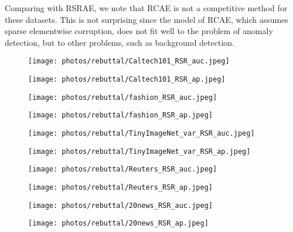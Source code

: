 \documentclass{article} \usepackage{iclr2020_conference,times}
\begin{document}
Comparing with RSRAE, we note that RCAE is not a competitive method for these datasets. This is not surprising since the model of RCAE, which assumes sparse elementwise corruption, does not fit well to the problem of anomaly detection, but to other problems, such as background detection. 


\begin{figure}[htbp]
\centering
\begin{minipage}[t]{0.48\textwidth}
\centering
\texttt{[image: photos/rebuttal/Caltech101\_RSR\_auc.jpeg]}
\end{minipage}
\begin{minipage}[t]{0.48\textwidth}
\centering
\texttt{[image: photos/rebuttal/Caltech101\_RSR\_ap.jpeg]}
\end{minipage}


\centering
\begin{minipage}[t]{0.48\textwidth}
\centering
\texttt{[image: photos/rebuttal/fashion\_RSR\_auc.jpeg]}
\end{minipage}
\begin{minipage}[t]{0.48\textwidth}
\centering
\texttt{[image: photos/rebuttal/fashion\_RSR\_ap.jpeg]}
\end{minipage}


\centering
\begin{minipage}[t]{0.48\textwidth}
\centering
\texttt{[image: photos/rebuttal/TinyImageNet\_var\_RSR\_auc.jpeg]}
\end{minipage}
\begin{minipage}[t]{0.48\textwidth}
\centering
\texttt{[image: photos/rebuttal/TinyImageNet\_var\_RSR\_ap.jpeg]}
\end{minipage}




\centering
\begin{minipage}[t]{0.48\textwidth}
\centering
\texttt{[image: photos/rebuttal/Reuters\_RSR\_auc.jpeg]}
\end{minipage}
\begin{minipage}[t]{0.48\textwidth}
\centering
\texttt{[image: photos/rebuttal/Reuters\_RSR\_ap.jpeg]}
\end{minipage}



\centering
\begin{minipage}[t]{0.48\textwidth}
\centering
\texttt{[image: photos/rebuttal/20news\_RSR\_auc.jpeg]}
\end{minipage}
\begin{minipage}[t]{0.48\textwidth}
\centering
\texttt{[image: photos/rebuttal/20news\_RSR\_ap.jpeg]}
\end{minipage}



\end{figure}
\end{document}
